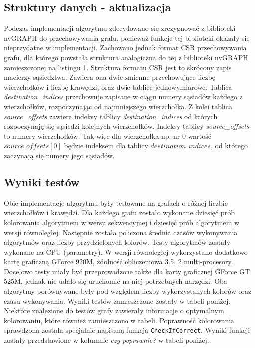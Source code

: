 \documentclass{article}
\begin{document}
	\subsection{Struktury danych - aktualizacja}
	Podczas implementacji algorytmu zdecydowano się zrezygnować z biblioteki nvGRAPH do przechowywania grafu, ponieważ funkcje tej biblioteki okazały się nieprzydatne w implementacji. Zachowano jednak format CSR przechowywania grafu, dla którego powstała struktura analogiczna do tej z biblioteki nvGRAPH zamieszczonej na listingu 1. Struktura formatu CSR jest to skrócony zapis macierzy sąsiedztwa. Zawiera ona dwie zmienne przechowujące liczbę wierzchołków i liczbę krawędzi, oraz dwie tablice jednowymiarowe. Tablica \textit{destination\_indices} przechowuje zapisane w ciągu numery sąsiadów każdego z wierzchołków, rozpoczynając od najmniejszego wierzchołka. Z kolei tablica \textit{source\_offsets} zawiera indeksy tablicy \textit{destination\_indices} od których rozpoczynają się sąsiedzi kolejnych wierzchołków. Indeksy tablicy \textit{source\_offsets} to numery wierzchołków. Tak więc dla wierzchołka np. nr $0$ wartość $source\_offsets[0]$ będzie indeksem dla tablicy $destination\_indices$, od którego zaczynają się numery jego sąsiadów.
	
	\subsection{Wyniki testów}
	Obie implementacje algorytmu były testowane na grafach o różnej liczbie wierzchołków i krawędzi. Dla każdego grafu zostało wykonane dziesięć prób kolorowania algorytmem w wersji sekwencyjnej i dziesięć prób algorytmem w wersji równoległej. Następnie została policzona średnia czasów wykonywania algorytmów oraz liczby przydzielonych kolorów. Testy algorytmów zostały wykonane na CPU (parametry). W wersji równoległej wykorzystano dodatkowo kartę graficzną GForce 920M, zdolność obliczeniowa 3.5, 2 multi-procesory. Docelowo testy miały być przeprowadzone także dla karty graficznej GForce GT 525M, jednak nie udało się uruchomić na niej potrzebnych narzędzi. Oba algorytmy porównywane były pod względem liczby wykorzystanych kolorów oraz czasu wykonywania. Wyniki testów zamieszczone zostały w tabeli poniżej. Niektóre znalezione do testów grafy zawierały informacje o optymalnym kolorowaniu, które również zamieszczono w tabeli. Poprawność kolorowania sprawdzona została specjalnie napisaną funkcją \verb|CheckIfCorrect|. Wyniki funkcji zostały przedstawione w kolumnie \textit{czy poprawnie?} w tabeli poniżej.
	
\end{document}
